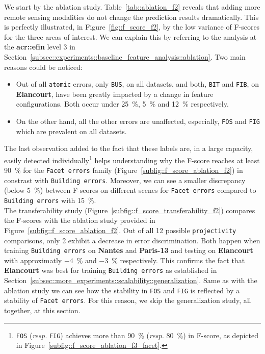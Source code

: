         We start by the ablation study.
        Table~\ref{tab::ablation_f2} reveals that adding more remote sensing modalities do not change the prediction results dramatically.
        This is perfectly illustrated, in Figure~\ref{fig::f_score_f2}, by the low variance of F-scores for the three areas of interest.
        We can explain this by referring to the analysis at the \textbf{\gls{acr::efin}} level 3 in Section~\ref{subsec::experiments::baseline_feature_analysis::ablation}.
        Two main reasons could be noticed:
        \begin{itemize}[label=\(\blacktriangleright\)]
            \item Out of all \texttt{atomic} errors, only \texttt{BUS}, on all datasets, and both, \texttt{BIT} and \texttt{FIB}, on \textbf{Elancourt}, have been greatly impacted by a change in feature configurations.
                    Both occur under \SI{25}{\percent}, \SI{5}{\percent} and \SI{12}{\percent} respectively.
            \item On the other hand, all the other errors are unaffected, especially, \texttt{FOS} and \texttt{FIG} which are prevalent on all datasets.
        \end{itemize}
        The last observation added to the fact that these labels are, in a large capacity, easily detected individually\footnote{
            \texttt{FOS} (\textit{resp.} \texttt{FIG}) achieves more than \SI{90}{\percent} (\textit{resp.} \SI{80}{\percent}) in F-score, as depicted in Figure~\ref{subfig::f_score_ablation_f3_facet}.
        } helps understanding why the F-score reaches at least \SI{90}{\percent} for the \texttt{Facet errors} family (Figure~\ref{subfig::f_score_ablation_f2}) in constrast with \texttt{Building errors}.
        Moreover, we can see a smaller discrepancy (below \SI{5}{\percent}) between F-scores on different scenes for \texttt{Facet errors} compared to \texttt{Building errors} with \SI{15}{\percent}.\\

        The transferability study (Figure~\ref{subfig::f_score_transferability_f2}) compares the F-scores with the ablation study provided in Figure~\ref{subfig::f_score_ablation_f2}.
        Out of all 12 possible \texttt{projectivity} comparisons, only 2 exhibit a decrease in error discrimination.
        Both happen when training \texttt{Building errors} on \textbf{Nantes} and \textbf{Paris-13} and testing on \textbf{Elancourt} with approximatly \SI{-4}{\percent} and \SI{-3}{\percent} respectively.
        This confirms the fact that \textbf{Elancourt} was best for training \texttt{Building errors} as established in Section~\ref{subsec::more_experiments::scalability::generalization}.
        Same as with the ablation study we can see how the stability in \texttt{FOS} and \texttt{FIG} is reflected by a stability of \texttt{Facet errors}.
        For this reason, we skip the generalization study, all together, at this section.\\

